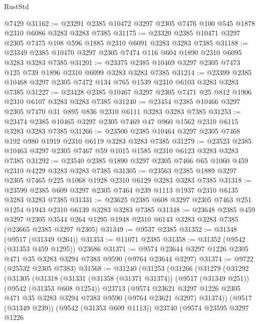 \begin{lexlean}{RustStd}
\begin{coremodule}
    @7429
@31162 := @23291 @2385 @10472 @3297 @2305 @7476 @100 @545 @1878 @2310 @6086 @3283 @3283 @7385
@31175 := @23320 @2385 @10471 @3297 @2305 @7475 @108 @596 @1885 @2310 @6091 @3283 @3283 @7385
@31188 := @23349 @2385 @10470 @3297 @2305 @7474 @116 @604 @1890 @2310 @6095 @3283 @3283 @7385
@31201 := @23375 @2385 @10469 @3297 @2305 @7473 @125 @739 @1896 @2310 @6099 @3283 @3283 @7385
@31214 := @23399 @2385 @10468 @3297 @2305 @7472 @134 @765 @1539 @2310 @6103 @3283 @3283 @7385
@31227 := @23428 @2385 @10467 @3297 @2305 @7471 @25 @812 @1906 @2310 @6107 @3283 @3283 @7385
@31240 := @23454 @2385 @10466 @3297 @2305 @7470 @31 @895 @836 @2310 @6111 @3283 @3283 @7385
@31253 := @23474 @2385 @10465 @3297 @2305 @7469 @47 @960 @1562 @2310 @6115 @3283 @3283 @7385
@31266 := @23500 @2385 @10464 @3297 @2305 @7468 @192 @980 @1919 @2310 @6119 @3283 @3283 @7385
@31279 := @23523 @2385 @10463 @3297 @2305 @7467 @59 @1015 @1585 @2310 @6123 @3283 @3283 @7385
@31292 := @23540 @2385 @1890 @3297 @2305 @7466 @65 @1060 @459 @2310 @4229 @3283 @3283 @7385
@31305 := @23563 @2385 @1889 @3297 @2305 @7465 @225 @1068 @1928 @2310 @6129 @3283 @3283 @7385
@31318 := @23599 @2385 @609 @3297 @2305 @7464 @239 @1113 @1937 @2310 @6135 @3283 @3283 @7385
@31331 := @23625 @2385 @608 @3297 @2305 @7463 @251 @1254 @1943 @2310 @6139 @3283 @3283 @7385
@31348 := @23648
    @2385
    @459
    @3297
    @2305
    @3544
    @264
    @1295
    @1948
    @2310
    @6143
    @3283
    @3283
    @7385
    (@23665 @2385 @3297 @2305)
@31349 := @9537 @2385
@31352 := @31348 (@9517 (@31349 @264))
@31353 := @11071 @2385
@31358 := @31352 (@9542 (@31353 @459 @1295)) @23686
@31371 := @9574 @23644 @3297 @1226 @2305 @471 @35 @3283 @3294 @7383 @9590 (@9764 @23644 @3297)
@31374 := @9722 (@25532 @2305 @7383)
@31568 := @31240
    (@31253
      (@31266
        (@31279
          (@31292
            (@31305
              (@31318
                (@31331
                  (@31358 (@31371 @31374))
                  (@9517 (@31349 @251))
                  (@9542 (@31353 @608 @1254))
                  @23713
                  (@9574
                    @23621
                    @3297
                    @1226
                    @2305
                    @471
                    @35
                    @3283
                    @3294
                    @7383
                    @9590
                    (@9764 @23621 @3297)
                    @31374))
                (@9517 (@31349 @239))
                (@9542 (@31353 @609 @1113))
                @23740
                (@9574
                  @23595
                  @3297
                  @1226

\end{coremodule}
\end{lexlean}
